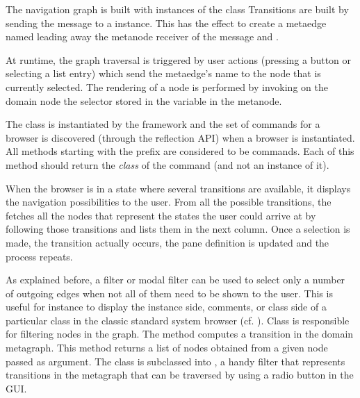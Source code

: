 \documentclass[a4paper,10pt,twoside]{book}
\begin{document}
The navigation graph is built with instances of the class  Transitions are built by sending the message  to a  instance. This has the effect to create a metaedge named  leading away the metanode receiver of the message and .

At runtime, the graph traversal is triggered by user actions (\eg pressing a button or selecting a list entry) which send the metaedge's name to the node that is currently selected. The rendering of a node is performed by invoking on the domain node the selector stored in the variable  in the metanode.

The class  is instantiated by the framework and the set of commands for a browser is discovered (through the \st reflection API) when a browser is instantiated. All methods starting with the  prefix are considered to be commands. Each of this method should return the \emph{class} of the command (and not an instance of it).


When the browser is in a state where several transitions are available, it displays the navigation possibilities to the user. From all the possible transitions, the \obf fetches all the nodes that represent the states the user could arrive at by following those transitions and lists them in the next column. Once a selection is made, the transition  actually occurs, the pane definition is updated and the process repeats.

As explained before, a filter or modal filter can be used to select only a number of outgoing edges when not all of them need to be shown to the user. This is useful for instance to display the instance side, comments, or class side of a particular class in the classic standard system browser (cf. ). Class  is responsible for filtering nodes in the graph. The method  computes a transition in the domain metagraph. This method returns a list of nodes obtained from a given node passed as argument. The class  is subclassed into , a handy filter that represents transitions in the metagraph that can be traversed by using a radio button in the GUI.
\end{document}
